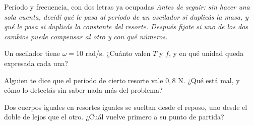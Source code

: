 \documentclass[11pt,openany]{book}
\begin{document}
\begin{bloque}{Período y frecuencia, con dos letras ya ocupadas}
\textit{Antes de seguir: sin hacer una sola cuenta, decidí qué le pasa al período de un oscilador si duplicás la masa, y qué le pasa si duplicás la constante del resorte. Después fijate si uno de los dos cambios puede compensar al otro y con qué números.}
\end{bloque}

\begin{chequeo}
\item Un oscilador tiene $\omega = 10$ rad/s. ¿Cuánto valen $T$ y $f$, y en qué unidad queda expresada cada una?
\item Alguien te dice que el período de cierto resorte vale $0{,}8$ N. ¿Qué está mal, y cómo lo detectás sin saber nada más del problema?
\item Dos cuerpos iguales en resortes iguales se sueltan desde el reposo, uno desde el doble de lejos que el otro. ¿Cuál vuelve primero a su punto de partida?
\end{chequeo}
\end{document}
